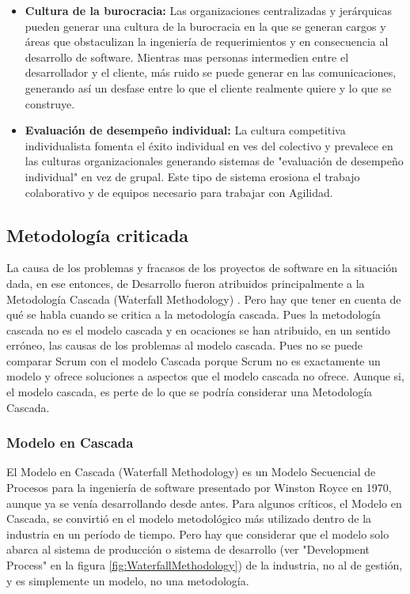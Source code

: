 \begin{itemize}
\item \textbf{Cultura de la burocracia: } 
Las organizaciones centralizadas y jerárquicas pueden generar una cultura de la burocracia en la que se generan cargos y áreas que obstaculizan la ingeniería de requerimientos y en consecuencia al desarrollo de software. Mientras mas personas intermedien entre el desarrollador y el cliente, más ruido se puede generar en las comunicaciones, generando así un desfase entre lo que el cliente realmente quiere y lo que se construye.

\item \textbf{Evaluación de desempeño individual: } 
La cultura competitiva individualista fomenta el éxito individual en ves del colectivo y prevalece en las culturas organizacionales generando sistemas de "evaluación de desempeño individual" en vez de grupal. Este tipo de sistema erosiona el trabajo colaborativo y de equipos necesario para trabajar con Agilidad.

\end{itemize}

\subsection{Metodología criticada}

La causa de los problemas y fracasos de los proyectos de software en la situación dada, en ese entonces, de Desarrollo fueron atribuidos principalmente a la Metodología Cascada (Waterfall Methodology) \cite{Ken-Schwaber-1995}. Pero hay que tener en cuenta de qué se habla cuando se critica a la metodología cascada. Pues la metodología cascada no es el modelo cascada y en ocaciones se han atribuido, en un sentido erróneo, las causas de los problemas al modelo cascada. Pues no se puede comparar Scrum con el modelo Cascada porque Scrum no es exactamente un modelo y ofrece soluciones a aspectos que el modelo cascada no ofrece. Aunque si, el modelo cascada, es perte de lo que se podría considerar una Metodología Cascada. 

\subsubsection{Modelo en Cascada}

El Modelo en Cascada (Waterfall Methodology) \cite{Ken-Schwaber-1995} es un Modelo Secuencial de Procesos para la ingeniería de software presentado por Winston Royce en 1970, aunque ya se venía desarrollando desde antes. Para algunos críticos, el Modelo en Cascada, se convirtió en el modelo metodológico más utilizado dentro de la industria en un período de tiempo. Pero hay que considerar que el modelo solo abarca al sistema de producción o sistema de desarrollo (ver "Development Process" en la figura \ref{fig:WaterfallMethodology}) de la industria, no al de gestión, y es simplemente un modelo, no una metodología.

